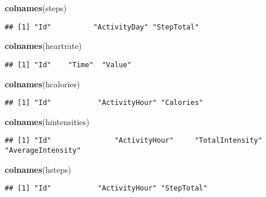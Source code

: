 \documentclass[
]{article}
\newenvironment{Shaded}{\begin{snugshade}}{\end{snugshade}}
\newcommand{\FunctionTok}[1]{\textcolor[rgb]{0.13,0.29,0.53}{\textbf{#1}}}
\newcommand{\NormalTok}[1]{#1}
\begin{document}
\begin{Shaded}
\begin{Highlighting}[]
\FunctionTok{colnames}\NormalTok{(steps)}
\end{Highlighting}
\end{Shaded}

\begin{verbatim}
## [1] "Id"          "ActivityDay" "StepTotal"
\end{verbatim}

\begin{Shaded}
\begin{Highlighting}[]
\FunctionTok{colnames}\NormalTok{(heartrate)}
\end{Highlighting}
\end{Shaded}

\begin{verbatim}
## [1] "Id"    "Time"  "Value"
\end{verbatim}

\begin{Shaded}
\begin{Highlighting}[]
\FunctionTok{colnames}\NormalTok{(hcalories)}
\end{Highlighting}
\end{Shaded}

\begin{verbatim}
## [1] "Id"           "ActivityHour" "Calories"
\end{verbatim}

\begin{Shaded}
\begin{Highlighting}[]
\FunctionTok{colnames}\NormalTok{(hintensities)}
\end{Highlighting}
\end{Shaded}

\begin{verbatim}
## [1] "Id"               "ActivityHour"     "TotalIntensity"   "AverageIntensity"
\end{verbatim}

\begin{Shaded}
\begin{Highlighting}[]
\FunctionTok{colnames}\NormalTok{(hsteps)}
\end{Highlighting}
\end{Shaded}

\begin{verbatim}
## [1] "Id"           "ActivityHour" "StepTotal"
\end{verbatim}
\end{document}
